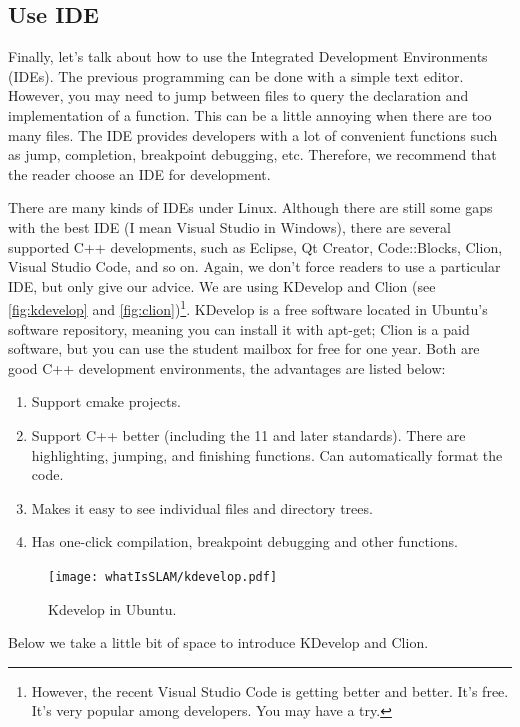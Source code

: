 \subsection{Use IDE}
Finally, let's talk about how to use the Integrated Development Environments (IDEs). The previous programming can be done with a simple text editor. However, you may need to jump between files to query the declaration and implementation of a function. This can be a little annoying when there are too many files. The IDE provides developers with a lot of convenient functions such as jump, completion, breakpoint debugging, etc. Therefore, we recommend that the reader choose an IDE for development.

There are many kinds of IDEs under Linux. Although there are still some gaps with the best IDE (I mean Visual Studio in Windows), there are several supported C++ developments, such as Eclipse, Qt Creator, Code::Blocks, Clion, Visual Studio Code, and so on. Again, we don't force readers to use a particular IDE, but only give our advice. We are using KDevelop and Clion (see \autoref{fig:kdevelop} and \autoref{fig:clion})\footnote{However, the recent Visual Studio Code is getting better and better. It's free. It's very popular among developers. You may have a try. }. KDevelop is a free software located in Ubuntu's software repository, meaning you can install it with apt-get; Clion is a paid software, but you can use the student mailbox for free for one year. Both are good C++ development environments, the advantages are listed below:

\begin{enumerate}
    \item Support cmake projects.
    \item Support C++ better (including the 11 and later standards). There are highlighting, jumping, and finishing functions. Can automatically format the code.
    \item Makes it easy to see individual files and directory trees.
    \item Has one-click compilation, breakpoint debugging and other functions.
\end{enumerate}

\begin{figure}[!ht]
    \centering
    \texttt{[image: whatIsSLAM/kdevelop.pdf]}
    \caption{Kdevelop in Ubuntu.}
    \label{fig:kdevelop}
\end{figure}

Below we take a little bit of space to introduce KDevelop and Clion.

